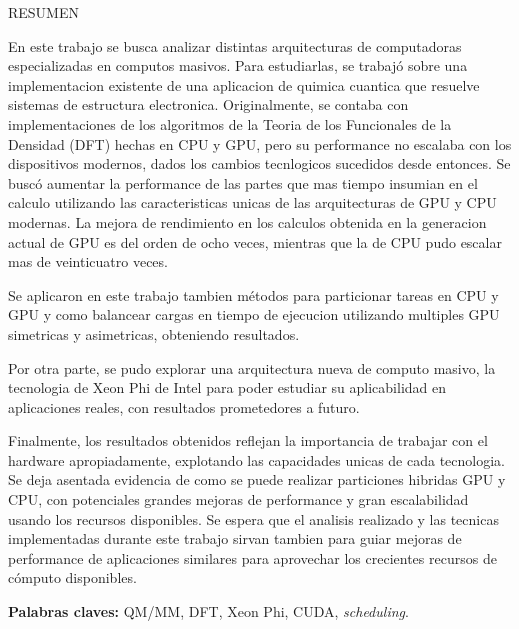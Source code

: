 \begin{center}
\large \textsc{RESUMEN}
\end{center}
\vspace{1cm}

\noindent

En este trabajo se busca analizar distintas arquitecturas de computadoras especializadas
en computos masivos. Para estudiarlas, se trabaj\'o sobre una implementacion existente
de una aplicacion de quimica cuantica que resuelve sistemas de estructura electronica.
Originalmente, se contaba con implementaciones de los algoritmos de la Teoria de los
Funcionales de la Densidad (DFT) hechas en CPU y GPU, pero su performance no escalaba con los
dispositivos modernos, dados los cambios tecnlogicos sucedidos desde entonces. Se busc\'o
aumentar la performance de las partes que mas tiempo insumian en el calculo utilizando
las caracteristicas unicas de las arquitecturas de GPU y CPU modernas. La mejora de
rendimiento en los calculos obtenida en la generacion actual de GPU es del orden de ocho
veces, mientras que la de CPU pudo escalar mas de veinticuatro veces.

Se aplicaron en este trabajo tambien m\'etodos para particionar tareas en CPU y GPU y como
balancear cargas en tiempo de ejecucion utilizando multiples GPU simetricas y asimetricas,
obteniendo resultados.

Por otra parte, se pudo explorar una arquitectura nueva de computo masivo, la
tecnologia de Xeon Phi de Intel para poder estudiar su aplicabilidad en aplicaciones reales, con
resultados prometedores a futuro.

Finalmente, los resultados obtenidos reflejan la importancia de trabajar con el hardware
apropiadamente, explotando las capacidades unicas de cada tecnologia. Se deja asentada evidencia
de como se puede realizar particiones hibridas GPU y CPU, con potenciales grandes mejoras
de performance y gran escalabilidad usando los recursos disponibles. Se espera que el analisis
realizado y las tecnicas implementadas durante este trabajo sirvan tambien para guiar mejoras
de performance de aplicaciones similares para aprovechar los crecientes recursos de c\'omputo
disponibles.

\bigskip

\noindent\textbf{Palabras claves:} QM/MM, DFT, Xeon Phi, CUDA, \textit{scheduling}.

